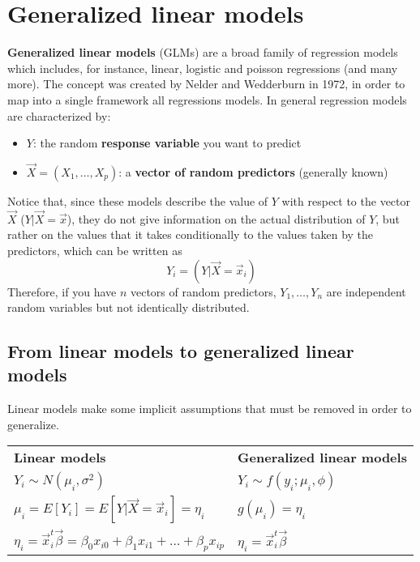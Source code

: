 \chapter{Generalized linear models}
  \textbf{Generalized linear models} (GLMs) are a broad family of regression models which includes, for instance, linear, logistic and poisson regressions (and many more). The concept was created by Nelder and Wedderburn in 1972, in order to map into a single framework all regressions models.
  In general regression models are characterized by:
  \begin{itemize}
    \item $Y$: the random \textbf{response variable} you want to predict
    \item $\vec{X}=(X_1, \dots, X_p)$: a \textbf{vector of random predictors} (generally known)
  \end{itemize}
  Notice that, since these models describe the value of $Y$ with respect to the vector $\vec{X}$ ($Y|\vec{X}=\vec{x}$), they do not give information on the actual distribution of $Y$, but rather on the values that it takes conditionally to the values taken by the predictors, which can be written as
  $$Y_i=(Y|\vec{X}=\vec{x}_i)$$
  Therefore, if you have $n$ vectors of random predictors, $Y_1, \dots, Y_n$ are independent random variables but not identically distributed.

  \section{From linear models to generalized linear models}
    Linear models make some implicit assumptions that must be removed in order to generalize.
    
    \begin{tabularx}{1\textwidth} { 
    >{\centering\arraybackslash}X 
    >{\centering\arraybackslash}X }

    \textbf{Linear models} & 
    \textbf{Generalized linear models} \\

    $Y_i \sim N(\mu_i, \sigma^2)$ & 
    $Y_i \sim f(y_i; \mu_i, \phi)$ \\

    $\mu_i = E[Y_i] = E[Y|\vec{X} = \vec{x}_i] = \eta_i$ & 
    $g(\mu_i) = \eta_i$ \\

    $\eta_i = \vec{x}_i^t\vec{\beta} = \beta_0x_{i0} + \beta_1x_{i1} + \dots + \beta_px_{ip}$ & 
    $\eta_i = \vec{x}_i^t\vec{\beta}$  \\
    \end{tabularx}

